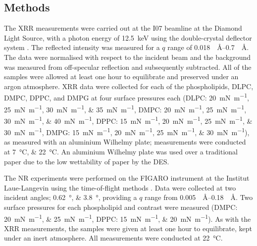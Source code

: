 \subsection{Methods}
The XRR measurements were carried out at the I07 beamline at the Diamond Light Source, with a photon energy of \SI{12.5}{\kilo\electronvolt} using the double-crystal deflector system \cite{arnold_implementation_2012}.
The reflected intensity was measured for a $q$ range of \SIrange{0.018}{0.7}{\per\angstrom}.
The data were normalised with respect to the incident beam and the background was measured from off-specular reflection and subsequently subtracted.
All of the samples were allowed at least one hour to equilibrate and preserved under an argon atmosphere.
XRR data were collected for each of the phospholipids, DLPC, DMPC, DPPC, and DMPG at four surface pressures each (DLPC: \SIlist{20;25;30;35}{\milli\newton\per\meter}, DMPC: \SIlist{20;25;30;40}{\milli\newton\per\meter}, DPPC: \SIlist{15;20;25;30}{\milli\newton\per\meter}, DMPG: \SIlist{15;20;25;30}{\milli\newton\per\meter}), as measured with an aluminium Wilhelmy plate; measurements were conducted at \SIlist{7;22}{\celsius}.
An aluminium Wilhelmy plate was used over a traditional paper due to the low wettability of paper by the DES.

The NR experiments were performed on the FIGARO instrument at the Institut Laue-Langevin using the time-of-flight methods \cite{campbell_figaro_2011}.
Data were collected at two incident angles; \SIlist{0.62;3.8}{\degree}, providing a $q$ range from \SIrange{0.005}{0.18}{\per\angstrom}.
Two surface pressures for each phospholipid and contrast were measured (DMPC: \SIlist{20;25}{\milli\newton\per\meter}, DPPC: \SIlist{15;20}{\milli\newton\per\meter}).
As with the XRR measurements, the samples were given at least one hour to equilibrate, kept under an inert atmosphere.
All measurements were conducted at \SI{22}{\celsius}.
